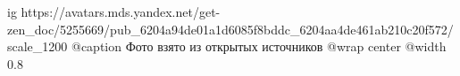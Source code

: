  
 
 
 
 

\ifcmt
  ig https://avatars.mds.yandex.net/get-zen_doc/5255669/pub_6204a94de01a1d6085f8bddc_6204aa4de461ab210c20f572/scale_1200
  @caption Фото взято из открытых источников
  @wrap center
  @width 0.8
\fi
